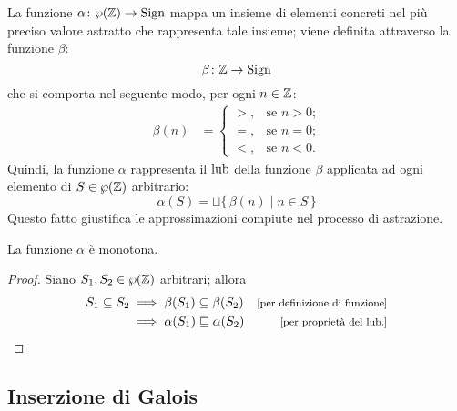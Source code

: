 \begin{definizione} 
La funzione $\mathord{\alpha}\colon\wp(\mathbb{Z})\to\mathrm{Sign}$ mappa un insieme
di elementi concreti nel più preciso valore astratto che rappresenta
tale insieme; viene definita attraverso la funzione $\beta$:
\[
  \mathord{\beta}\colon\mathbb{Z}\to\mathrm{Sign}
\]
che si comporta nel seguente modo, per ogni $n \in \mathbb{Z}$:
\begin{align*}
  \beta(n) &=
    \begin{cases}
      >,      &\text{se $n  >  0$;} \\
      =,      &\text{se $n = 0$;} \\
      <,      &\text{se $n < 0$.}
    \end{cases} 
\end{align*}
Quindi, la funzione $\alpha$ rappresenta il $\mathop{\mathrm{lub}}\nolimits$ della
funzione $\beta$ applicata ad ogni elemento di $S \in \wp(\mathbb{Z})$ arbitrario:
\[
  \alpha(S) = \sqcup \{\, \beta(n) \mid n \in S \,\}
\]
Questo fatto giustifica le approssimazioni compiute nel processo
di astrazione.
\end{definizione}

\begin{proposizione}
La funzione $\alpha$ è monotona.
\end{proposizione}
\begin{proof}
Siano $S_1, S_2 \in \wp(\mathbb{Z})$ arbitrari; allora
  \begin{align*}
    S_1 \subseteq S_2
      &\implies \beta(S_1) \subseteq \beta(S_2)
      &\law{per definizione di funzione} \\
      &\implies \alpha(S_1) \sqsubseteq \alpha(S_2)
      &\law{per proprietà del $\lub$.}
  \end{align*}
\end{proof}

\subsection{Inserzione di Galois}


